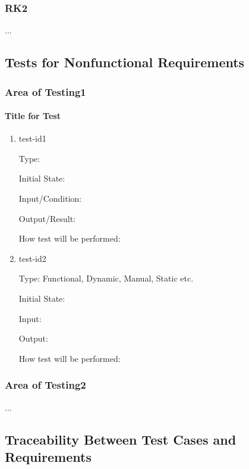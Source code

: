 \documentclass[12pt, titlepage]{article}
\begin{document}
\subsubsection{RK2}

...

\subsection{Tests for Nonfunctional Requirements}

\subsubsection{Area of Testing1}
		
\paragraph{Title for Test}

\begin{enumerate}

\item{test-id1\\}

Type: 
					
Initial State: 
					
Input/Condition: 
					
Output/Result: 
					
How test will be performed: 
					
\item{test-id2\\}

Type: Functional, Dynamic, Manual, Static etc.
					
Initial State: 
					
Input: 
					
Output: 
					
How test will be performed: 

\end{enumerate}

\subsubsection{Area of Testing2}

...

\subsection{Traceability Between Test Cases and Requirements}
\end{document}
